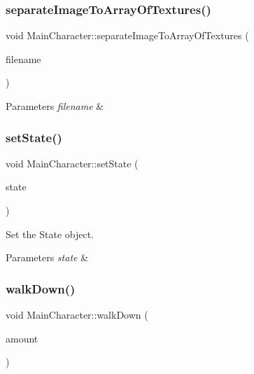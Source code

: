 \subsubsection{\texorpdfstring{separateImageToArrayOfTextures()}{separateImageToArrayOfTextures()}}
{\footnotesize\ttfamily void Main\+Character\+::separate\+Image\+To\+Array\+Of\+Textures (\begin{DoxyParamCaption}\item[{const std\+::string \&}]{filename }\end{DoxyParamCaption})}


\begin{DoxyParams}{Parameters}
{\em filename} & \\
\hline
\end{DoxyParams}
\mbox{\label{classMainCharacter_a557d59154e4d12af391ee5d218b7dcc8}} 
\subsubsection{\texorpdfstring{setState()}{setState()}}
{\footnotesize\ttfamily void Main\+Character\+::set\+State (\begin{DoxyParamCaption}\item[{State\+Of\+Character}]{state }\end{DoxyParamCaption})}



Set the State object. 


\begin{DoxyParams}{Parameters}
{\em state} & \\
\hline
\end{DoxyParams}
\mbox{\label{classMainCharacter_afdd71154e531e45bc152c52df4d35bd2}} 
\subsubsection{\texorpdfstring{walkDown()}{walkDown()}}
{\footnotesize\ttfamily void Main\+Character\+::walk\+Down (\begin{DoxyParamCaption}\item[{float}]{amount }\end{DoxyParamCaption})}


